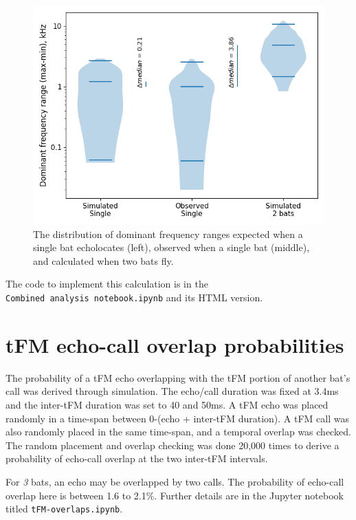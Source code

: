 \documentclass[
]{book}
\begin{document}
\begin{figure}
\includegraphics[width=1\linewidth]{original_papers/hbc-paper/combined_analysis/domfreqrange_singlemultisim} \caption{\label{fig:multidomfreqsim} The distribution of dominant frequency ranges expected when a single bat echolocates (left), observed when a single bat (middle), and calculated when two bats fly.}\label{fig:multidomfreqsim}
\end{figure}

The code to implement this calculation is in the \texttt{Combined\ analysis\ notebook.ipynb} and its HTML version.

\hypertarget{simtfmoverlap}{%
\section{tFM echo-call overlap probabilities}\label{simtfmoverlap}}

The probability of a tFM echo overlapping with the tFM portion of another bat's call was derived through simulation. The echo/call duration was fixed at 3.4ms and the inter-tFM duration was set to 40 and 50ms. A tFM echo was placed randomly in a time-span between 0-(echo + inter-tFM duration). A tFM call was also randomly placed in the same time-span, and a temporal overlap was checked. The random placement and overlap checking was done 20,000 times to derive a probability of echo-call overlap at the two inter-tFM intervals.

For \emph{3} bats, an echo may be overlapped by two calls. The probability of echo-call overlap here is between 1.6 to 2.1\%. Further details are in the Jupyter notebook titled \texttt{tFM-overlaps.ipynb}.
\end{document}
